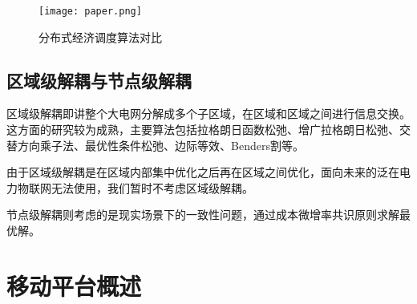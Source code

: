 




\begin{figure}[htbp] %
    \centering
    \texttt{[image: paper.png]}
    \caption{分布式经济调度算法对比}
    \label{fig:CompareAlgorithm}
\end{figure}

\subsection{区域级解耦与节点级解耦}


区域级解耦即讲整个大电网分解成多个子区域，在区域和区域之间进行信息交换。这方面的研究较为成熟，主要算法包括拉格朗日函数松弛、增广拉格朗日松弛、交替方向乘子法、最优性条件松弛、边际等效、Benders割等。

由于区域级解耦是在区域内部集中优化之后再在区域之间优化，面向未来的泛在电力物联网无法使用，我们暂时不考虑区域级解耦。

节点级解耦则考虑的是现实场景下的一致性问题，通过成本微增率共识原则求解最优解。

\section{移动平台概述}

